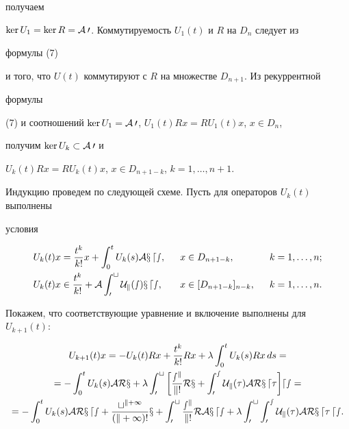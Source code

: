 \begin{pf}
получаем 


$\ker U_1=\ker R=\cal A0$. Коммутируемость $U_1(t)$ и $R$ на $D_n$ следует из 


формулы (7) 


и того, что $U(t)$ коммутируют с $R$ на множестве $D_{n+1}$. Из рекуррентной 


формулы 


(7) и соотношений $\ker U_1=\cal A0$, $U_1(t)Rx=RU_1(t)x$, $x\in D_n$, 


получим $\ker U_k\subset\cal A0$ и 


$U_k(t)Rx=RU_k(t)x$, $x\in D_{n+1-k}$, $k=1,\dotsc,n+1$. 


 


Индукцию проведем по следующей схеме. Пусть для операторов $U_k(t)$ выполнены 


условия 


\begin{alignat*}{3} 


U_k(t)x&=\frac{t^k}{k!}x+\int^t_0 U_k(s)\cal A x\,ds, &\ \ 


x&\in D_{n+1-k}, &\ \ k&=1,\dotsc,n;\\ 


% 


U_k(t)x&\in \frac{t^k}{k!}+\cal A\int^t_0 U_k(s)x\,ds, &\ \ 


x&\in[D_{n+1-k}]_{n-k}, &\ \ k&=1,\dotsc,n. 


\end{alignat*} 


Покажем, что соответствующие уравнение и включение выполнены для $U_{k+1}(t)$: 


\begin{multline*} 


U_{k+1}(t)x=-U_k(t)Rx+\frac{t^k}{k!}Rx+\lambda\int^t_0 U_k(s)Rx\,ds = \\ 


% 


=-\int^t_0 U_k(s)\cal A Rx+\lambda\int^t_0\bigg[\frac{s^k}{k!}Rx 


+\int^s_0 U_k(\tau)\cal A Rx\,d\tau\bigg]ds=\\ 


% 


=-\int^t_0 U_k(s)\cal A Rx\,ds+\frac{t^{k+1}}{(k+1)!}x+ 


\int^t_0 \frac{s^k}{k!}R\cal A x\,ds+\lambda\int^t_0\int^s_0 


U_k(\tau)\cal A Rx\,d\tau\,ds. 


\end{multline*} 



\end{pf}
